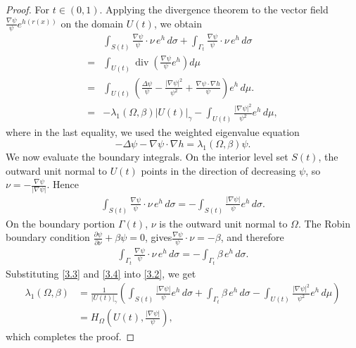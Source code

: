 \documentclass[11pt,leqno]{amsart}
\numberwithin{equation}{section}
\begin{document}
\begin{proof}
For  $t\in (0, 1)$. Applying the divergence theorem to the vector field $\frac{\nabla \psi}{\psi} e^{h(r(x))}$ on the domain $U(t)$, we obtain
    \begin{align}\label{3.2}
        &\int_{S(t)}\frac{\nabla \psi}{\psi}\cdot \nu \, e^{h}\,d\sigma + \int_{\Gamma_{t}}\frac{\nabla \psi}{\psi}\cdot \nu \, e^{h}\,d\sigma \\
        =& \int_{U(t)}\operatorname{div}\!\left(\frac{\nabla \psi}{\psi}e^{h}\right) d\mu \nonumber \\
        =& \int_{U(t)}\left(\frac{\Delta \psi}{\psi}-\frac{|\nabla \psi|^{2}}{\psi^{2}}+\frac{\nabla \psi \cdot \nabla h}{\psi}\right)e^{h}\,d\mu. \nonumber \\
        =&-\lambda_{1}(\Omega,\beta)|U(t)|_{\gamma} - \int_{U(t)}\frac{|\nabla \psi|^{2}}{\psi^{2}}e^{h}\,d\mu,\nonumber
    \end{align}
    where in the last equality, we used the weighted eigenvalue equation $$-\Delta \psi - \nabla \psi \cdot \nabla h = \lambda_1(\Omega,\beta) \psi.$$
We now evaluate the boundary integrals. On the interior level set $S(t)$, the outward unit normal to $U(t)$ points in the direction of decreasing $\psi$, so $\nu = -\frac{\nabla \psi}{|\nabla \psi|}$. Hence
    \begin{align}\label{3.3}
        \int_{S(t)}\frac{\nabla \psi}{\psi}\cdot \nu \, e^{h}\,d\sigma = -\int_{S(t)}\frac{|\nabla\psi|}{\psi}e^{h}\,d\sigma.
    \end{align}
On the boundary portion $\Gamma(t)$, $\nu$ is the outward unit normal to $\Omega$. The Robin boundary condition $\frac{\partial \psi}{\partial \nu} + \beta \psi = 0$, gives$\frac{\nabla \psi}{\psi} \cdot \nu = -\beta$, and therefore
    \begin{align}\label{3.4}
        \int_{\Gamma_{t}}\frac{\nabla \psi}{\psi}\cdot \nu \, e^{h}\,d\sigma = -\int_{\Gamma_{t}}\beta \, e^{h}\,d\sigma.
    \end{align}
Substituting \eqref{3.3} and \eqref{3.4} into \eqref{3.2}, we get
\begin{align}\label{eq:lambda_rep_expanded}
    \lambda_{1}(\Omega,\beta) &= \frac{1}{|U(t)|_{\gamma}}\left(\int_{S(t)}\frac{|\nabla \psi|}{\psi} e^{h}\,d\sigma + \int_{\Gamma_{t}}\beta \, e^{h}\,d\sigma - \int_{U(t)}\frac{|\nabla \psi|^{2}}{\psi^{2}}e^{h}\,d\mu\right) \\
    &= H_{\Omega}\!\left(U(t), \frac{|\nabla \psi|}{\psi}\right), \nonumber 
\end{align}
which completes the proof.
\end{proof}
\end{document}
